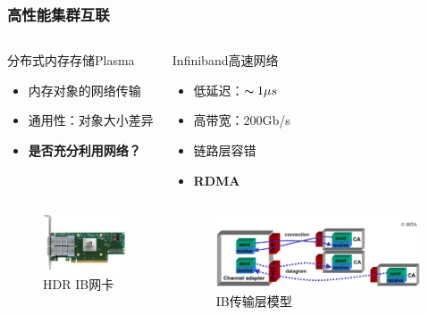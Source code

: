 \begin{frame}
	\frametitle{高性能集群互联}

	\vspace{-1.5em}
	\begin{columns}[t]
		\begin{block}{分布式内存存储Plasma}
			\begin{itemize}
				\item 内存对象的网络传输
				\item 通用性：对象大小差异
				\item \textbf{是否充分利用网络？}
			\end{itemize}
		\end{block}
		\begin{block}{Infiniband高速网络}
			\begin{itemize}
				\item 低延迟：$\thicksim 1\mu s$
				\item 高带宽：200Gb/s
				\item 链路层容错
				\item \textbf{RDMA}
			\end{itemize}
		\end{block}
	\end{columns}

	\begin{columns}[onlytextwidth]
		\begin{figure}
			\centering
			\includegraphics[scale=0.3]{image/presentation/hca.jpg}
			\caption{HDR IB网卡}
		\end{figure}
	
		\begin{figure}
			\centering
			\includegraphics[scale=0.13]{image/chap01/qp.png}
			\caption{IB传输层模型}
		\end{figure}
	\end{columns}
		
\end{frame}

